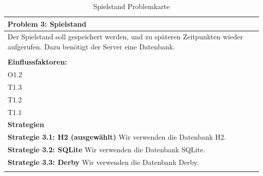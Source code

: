 \documentclass[fontsize=12pt,paper=a4,twoside]{scrartcl}
\begin{document}
\begin{table}[H]
    \centering
    \begin{tabular}{|p{15cm}|}
    \hline
          \textbf{Problem 3: Spielstand}  \\ \hline
	Der Spielstand soll gespeichert werden, und zu späteren Zeitpunkten wieder aufgerufen. Dazu benötigt der Server eine Datenbank. \\
         \\ \hline
          \textbf{Einflussfaktoren: } \\
	O1.2 \\
	T1.3 \\
	T1.2 \\
	T1.1 \\
          \hline
          \textbf{Strategien} \\ \hline
            {}          
           \label{strategie:3.1}     
          \textbf{Strategie 3.1: H2 (ausgewählt)}  Wir verwenden die Datenbank H2. \\        
  {}          
           \label{strategie:3.2}              
          \textbf{Strategie 3.2: SQLite} Wir verwenden die Datenbank SQLite. \\
	 {}          
           \label{strategie:3.3}     
          \textbf{Strategie 3.3: Derby } Wir verwenden die Datenbank Derby. \\ 
	 \\ \hline
    \end{tabular}

    \caption{Spielstand Problemkarte}
    \label{tab:ProblemKarte3}
\end{table}
\end{document}
